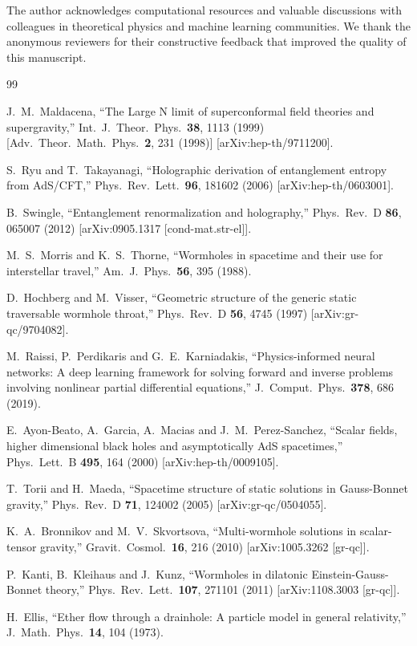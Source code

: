 \documentclass[aps,prd,twocolumn,showpacs,superscriptaddress]{revtex4-1}
\begin{document}
The author acknowledges computational resources and valuable discussions with colleagues in theoretical physics and machine learning communities. We thank the anonymous reviewers for their constructive feedback that improved the quality of this manuscript.

\begin{thebibliography}{99}

J.~M.~Maldacena,
``The Large N limit of superconformal field theories and supergravity,''
Int.\ J.\ Theor.\ Phys.\  {\bf 38}, 1113 (1999)
[Adv.\ Theor.\ Math.\ Phys.\  {\bf 2}, 231 (1998)]
[arXiv:hep-th/9711200].

S.~Ryu and T.~Takayanagi,
``Holographic derivation of entanglement entropy from AdS/CFT,''
Phys.\ Rev.\ Lett.\  {\bf 96}, 181602 (2006)
[arXiv:hep-th/0603001].

B.~Swingle,
``Entanglement renormalization and holography,''
Phys.\ Rev.\ D {\bf 86}, 065007 (2012)
[arXiv:0905.1317 [cond-mat.str-el]].

M.~S.~Morris and K.~S.~Thorne,
``Wormholes in spacetime and their use for interstellar travel,''
Am.\ J.\ Phys.\  {\bf 56}, 395 (1988).

D.~Hochberg and M.~Visser,
``Geometric structure of the generic static traversable wormhole throat,''
Phys.\ Rev.\ D {\bf 56}, 4745 (1997)
[arXiv:gr-qc/9704082].

M.~Raissi, P.~Perdikaris and G.~E.~Karniadakis,
``Physics-informed neural networks: A deep learning framework for solving forward and inverse problems involving nonlinear partial differential equations,''
J.\ Comput.\ Phys.\  {\bf 378}, 686 (2019).

E.~Ayon-Beato, A.~Garcia, A.~Macias and J.~M.~Perez-Sanchez,
``Scalar fields, higher dimensional black holes and asymptotically AdS spacetimes,''
Phys.\ Lett.\ B {\bf 495}, 164 (2000)
[arXiv:hep-th/0009105].

T.~Torii and H.~Maeda,
``Spacetime structure of static solutions in Gauss-Bonnet gravity,''
Phys.\ Rev.\ D {\bf 71}, 124002 (2005)
[arXiv:gr-qc/0504055].

K.~A.~Bronnikov and M.~V.~Skvortsova,
``Multi-wormhole solutions in scalar-tensor gravity,''
Gravit.\ Cosmol.\  {\bf 16}, 216 (2010)
[arXiv:1005.3262 [gr-qc]].

P.~Kanti, B.~Kleihaus and J.~Kunz,
``Wormholes in dilatonic Einstein-Gauss-Bonnet theory,''
Phys.\ Rev.\ Lett.\  {\bf 107}, 271101 (2011)
[arXiv:1108.3003 [gr-qc]].

H.~Ellis,
``Ether flow through a drainhole: A particle model in general relativity,''
J.\ Math.\ Phys.\  {\bf 14}, 104 (1973).

\end{thebibliography}
\end{document}

